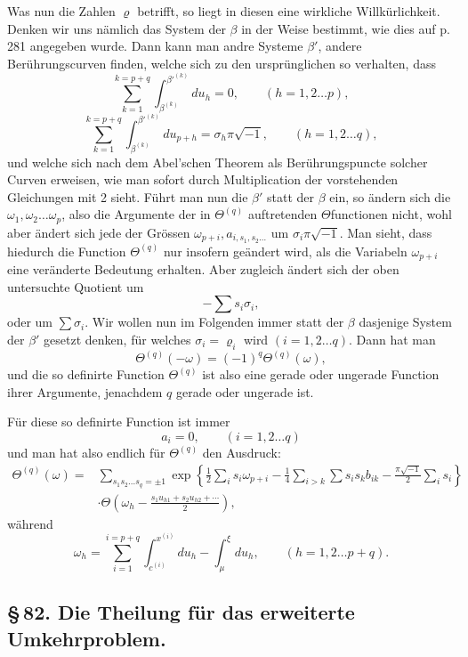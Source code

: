 \documentclass[10pt]{article}
\begin{document}
Was nun die Zahlen \(\varrho\) betrifft, so liegt in diesen eine wirkliche Willkürlichkeit. Denken wir uns nämlich das System der \(\beta\) in der Weise bestimmt, wie dies auf p. 281 angegeben wurde. Dann kann man andre Systeme \(\beta'\), andere Berührungscurven finden, welche sich zu den ursprünglichen so verhalten, dass
\[
\sum_{k=1}^{k=p+q}\int_{\beta^{(k)}}^{\beta'^{(k)}}du_h=0,
\qquad (h=1,2\ldots p),
\]
\[
\sum_{k=1}^{k=p+q}\int_{\beta^{(k)}}^{\beta'^{(k)}}du_{p+h}=\sigma_h\pi\sqrt{-1},
\qquad (h=1,2\ldots q),
\]
und welche sich nach dem Abel'schen Theorem als Berührungspuncte solcher Curven erweisen, wie man sofort durch Multiplication der vorstehenden Gleichungen mit 2 sieht. Führt man nun die \(\beta'\) statt der \(\beta\) ein, so ändern sich die \(\omega_1,\omega_2\ldots\omega_p\), also die Argumente der in \(\Theta^{(q)}\) auftretenden \(\Theta\)functionen nicht, wohl aber ändert sich jede der Grössen \(\omega_{p+i},a_{i,s_1,s_2\ldots}\) um \(\sigma_i\pi\sqrt{-1}\). Man sieht, dass hiedurch die Function \(\Theta^{(q)}\) nur insofern geändert wird, als die Variabeln \(\omega_{p+i}\) eine veränderte Bedeutung erhalten. Aber zugleich ändert sich der oben untersuchte Quotient um
\[
-\sum s_i\sigma_i,
\]
oder um \(\sum\sigma_i\). Wir wollen nun im Folgenden immer statt der \(\beta\) dasjenige System der \(\beta'\) gesetzt denken, für welches \(\sigma_i=\varrho_i\) wird \((i=1,2\ldots q)\). Dann hat man
\[
\Theta^{(q)}(-\omega)=(-1)^q\Theta^{(q)}(\omega),
\]
und die so definirte Function \(\Theta^{(q)}\) ist also eine gerade oder ungerade Function ihrer Argumente, jenachdem \(q\) gerade oder ungerade ist.

Für diese so definirte Function ist immer
\[
a_i=0,
\qquad (i=1,2\ldots q)
\]
und man hat also endlich für \(\Theta^{(q)}\) den Ausdruck:
\[
\begin{aligned}
\Theta^{(q)}(\omega)={}&
\sum_{s_1s_2\ldots s_q=\pm1}
\exp\!\left\{\frac12\sum_i s_i\omega_{p+i}
-\frac14\sum_{i>k}\sum s_i s_k b_{ik}
-\frac{\pi\sqrt{-1}}{2}\sum_i s_i\right\}\\
&\cdot\Theta\!\left(\omega_h-\frac{s_1u_{h1}+s_2u_{h2}+\cdots}{2}\right),
\end{aligned}
\]
während
\[
\omega_h=\sum_{i=1}^{i=p+q}\int_{c^{(i)}}^{x^{(i)}}du_h-\int_{\mu}^{\xi}du_h,
\qquad (h=1,2\ldots p+q).
\]

\subsection*{\S\,82. Die Theilung für das erweiterte Umkehrproblem.}
\end{document}
